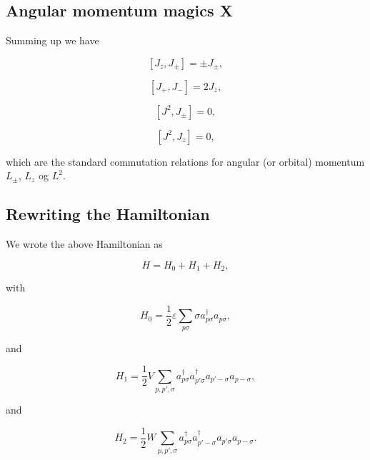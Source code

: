 \documentclass[11pt]{article}
\begin{document}
    \hypertarget{angular-momentum-magics-x}{%
\subsection{Angular momentum magics X}\label{angular-momentum-magics-x}}

Summing up we have

    \hypertarget{eq:kJzJpm}{}

\[
\begin{equation}
[J_z, J_\pm] = \pm J_\pm, \label{eq:kJzJpm} \tag{9} 
\end{equation}
\]

    \hypertarget{eq:kJpJm}{}

\[
\begin{equation} 
[J_+, J_-] = 2J_z, \label{eq:kJpJm} \tag{10} 
\end{equation}
\]

    \hypertarget{eq:kJ2Jpm}{}

\[
\begin{equation} 
[J^2, J_\pm] = 0, \label{eq:kJ2Jpm} \tag{11} 
\end{equation}
\]

    \hypertarget{eq:kJ2Jz}{}

\[
\begin{equation} 
[J^2,J_z] = 0, \label{eq:kJ2Jz} \tag{12}
\end{equation}
\]

    which are the standard commutation relations for angular (or orbital)
momentum \(L_\pm\), \(L_z\) og \(L^2\).

    \hypertarget{rewriting-the-hamiltonian}{%
\subsection{Rewriting the Hamiltonian}\label{rewriting-the-hamiltonian}}

We wrote the above Hamiltonian as

    \[
H = H_0 + H_1 +H_2,
\]

    with

    \[
H_0 = \frac{1}{2} \varepsilon \sum_{p\sigma}\sigma a_{p\sigma}^{\dagger}a_{p\sigma},
\]

    and

    \[
H_1 = \frac{1}{2} V \sum_{p,p',\sigma} a_{p\sigma}^\dagger a_{p'\sigma}^\dagger a_{p'-\sigma} a_{p-\sigma},
\]

    and

    \[
H_{2} = \frac{1}{2} W \sum_{p,p',\sigma}a_{p\sigma}^\dagger a_{p'-\sigma}^\dagger a_{p'\sigma}a_{p-\sigma}.
\]
\end{document}
